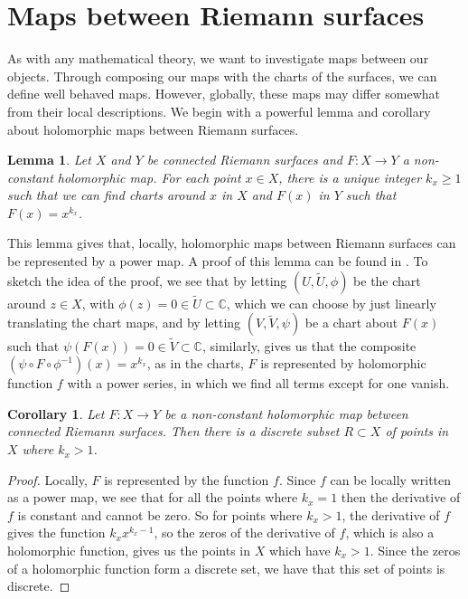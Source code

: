 \documentclass[11pt]{report}
\newtheorem{lemma}[thm]{Lemma}
\newtheorem{cor}[thm]{Corollary}
\theoremstyle{definition}
\newenvironment{sproof}{%
  \renewcommand{\proofname}{Sketch Proof}\proof}{\endproof}
\begin{document}
\section{Maps between Riemann surfaces}
As with any mathematical theory, we want to investigate maps between our objects. Through composing our maps with the charts of the surfaces, we can define well behaved maps. However, globally, these maps may differ somewhat from their local descriptions. 
We begin with a powerful lemma and corollary about holomorphic maps between Riemann surfaces.
\begin{lemma}
  Let $X$ and $Y$ be connected Riemann surfaces and $F:X \rightarrow Y$ a non-constant holomorphic map. For each point $x \in X$, there is a unique integer $k_x \geq 1$ such that we can find charts around $x$ in $X$ and $F(x)$ in $Y$ such that $F(x) = x^{k_x}$.
\end{lemma}
\begin{sproof}
  This lemma gives that, locally, holomorphic maps between Riemann surfaces can be represented by a power map. A proof of this lemma can be found in \cite[Proposition 5]{donaldson}. To sketch the idea of the proof, we see that by letting $(U,\tilde{U},\phi)$ be the chart around $z \in X$, with $\phi(z)=0\in \tilde{U} \subset \mathbb{C}$, which we can choose by just linearly translating the chart maps, and by letting $(V,\tilde{V},\psi)$ be a chart about $F(x)$ such that $\psi(F(x)) = 0 \in \tilde{V} \subset \mathbb{C}$, similarly, gives us that the composite $(\psi \circ F \circ \phi^{-1})(x)=x^{k_x}$, as in the charts, $F$ is represented by holomorphic function $f$ with a power series, in which we find all terms except for one vanish.
\end{sproof}
\begin{cor}
  Let $F:X \rightarrow Y$ be a non-constant holomorphic map between connected Riemann surfaces. Then there is a discrete subset $R \subset X$ of points in $X$ where $k_x > 1$.
\end{cor}
\begin{proof}
  Locally, $F$ is represented by the function $f$. Since $f$ can be locally written as a power map, we see that for all the points where $k_x = 1$ then the derivative of $f$ is constant and cannot be zero. So for points where $k_x > 1$, the derivative of $f$ gives the function $k_xx^{k_x-1}$, so the zeros of the derivative of $f$, which is also a holomorphic function, gives us the points in $X$ which have $k_x > 1$. Since the zeros of a holomorphic function form a discrete set, we have that this set of points is discrete.
\end{proof}
\end{document}
